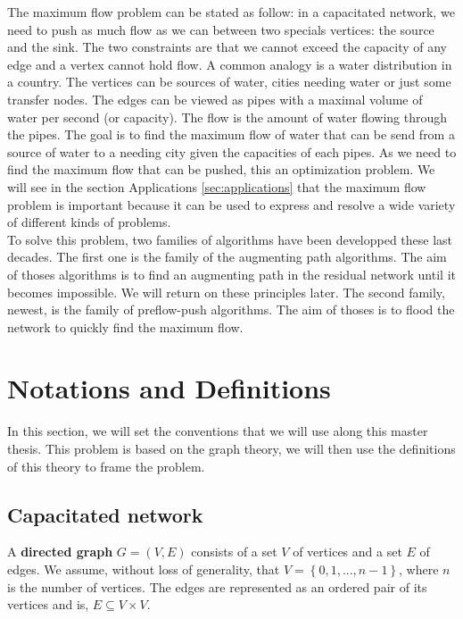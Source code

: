 The maximum flow problem can be stated as follow: in a capacitated network, we need to push as much flow as we can between two specials vertices: the source and the sink. The two constraints are that we cannot exceed the capacity of any edge and a vertex cannot hold flow. A common analogy is a water distribution in a country. The vertices can be sources of water, cities needing water or just some transfer nodes. The edges can be viewed as pipes with a maximal volume of water per second (or capacity). The flow is the amount of water flowing through the pipes. The goal is to find the maximum flow of water that can be send from a source of water to a needing city given the capacities of each pipes. As we need to find the maximum flow that can be pushed, this an optimization problem. We will see in the section Applications \ref{sec:applications} that the maximum flow problem is important because it can be used to express and resolve a wide variety of different kinds of problems.\\

To solve this problem, two families of algorithms have been developped these last decades. The first one is the family of the augmenting path algorithms. The aim of thoses algorithms is to find an augmenting path in the residual network until it becomes impossible. We will return on these principles later. The second family, newest, is the family of preflow-push algorithms. The aim of thoses is to flood the network to quickly find the maximum flow. \\


\section{Notations and Definitions}

In this section, we will set the conventions that we will use along this master thesis. This problem is based on the graph theory, we will then use the definitions of this theory to frame the problem.

\subsection{Capacitated network}
\begin{definition}
\label{dgraph}
A \textbf{directed graph} $G = (V, E)$ consists of a set $V$ of vertices and a set $E$ of edges. We assume, without loss of generality, that $V = \left\{0, 1, ..., n-1\right\}$, where $n$ is the number of vertices. The edges are represented as an ordered pair of its vertices and is, $E \subseteq V \times V$.
\end{definition}

